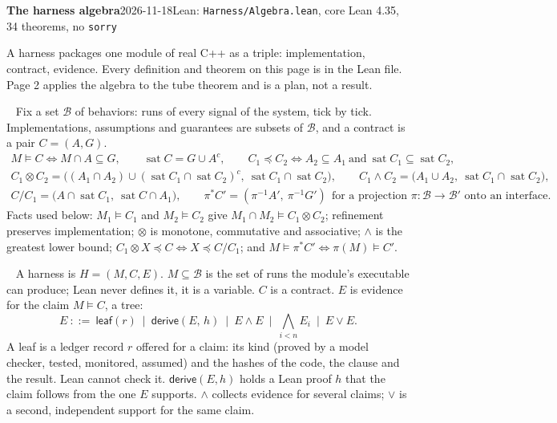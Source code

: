\documentclass[10pt]{article}
\newcommand{\head}[1]{\par\vspace{2pt}{\color{accent}\bfseries #1}\ }
\newcommand{\B}{\mathcal{B}}
\newcommand{\sat}{\operatorname{sat}}
\newcommand{\lean}[1]{\texttt{#1}}
\begin{document}
\fontsize{9.5pt}{11.4pt}\selectfont
\setlength{\abovedisplayskip}{3pt}\setlength{\belowdisplayskip}{3pt}\setlength{\abovedisplayshortskip}{2pt}\setlength{\belowdisplayshortskip}{2pt}

{\LARGE\bfseries The harness algebra}\hfill{\small 2026-11-18\quad Lean: \lean{Harness/Algebra.lean}, core Lean 4.35, 34 theorems, no \lean{sorry}}

\vspace{2pt}
A harness packages one module of real C++ as a triple: implementation, contract, evidence. Every definition and theorem on this page is in the Lean file. Page 2 applies the algebra to the tube theorem and is a plan, not a result.

\head{1. Contracts (recalled).} Fix a set $\B$ of behaviors: runs of every signal of the system, tick by tick. Implementations, assumptions and guarantees are subsets of $\B$, and a contract is a pair $C=(A,G)$.
\begin{gather*}
M\models C \iff M\cap A\subseteq G,\qquad \sat C = G\cup A^{c},\qquad C_1\preceq C_2 \iff A_2\subseteq A_1 \ \text{and}\ \sat C_1\subseteq \sat C_2,\\
C_1\otimes C_2=\bigl((A_1\cap A_2)\cup(\sat C_1\cap \sat C_2)^{c},\ \sat C_1\cap \sat C_2\bigr),\qquad
C_1\wedge C_2=\bigl(A_1\cup A_2,\ \sat C_1\cap \sat C_2\bigr),\\
C/C_1=\bigl(A\cap \sat C_1,\ \sat C\cap A_1\bigr),\qquad \pi^{*}C'=(\pi^{-1}A',\ \pi^{-1}G')\ \ \text{for a projection } \pi:\B\to\B' \text{ onto an interface.}
\end{gather*}
Facts used below: $M_1\models C_1$ and $M_2\models C_2$ give $M_1\cap M_2\models C_1\otimes C_2$; refinement preserves implementation; $\otimes$ is monotone, commutative and associative; $\wedge$ is the greatest lower bound; $C_1\otimes X\preceq C \iff X\preceq C/C_1$; and $M\models\pi^{*}C' \iff \pi(M)\models C'$.

\head{2. Harness.} A harness is $H=(M,C,E)$. $M\subseteq\B$ is the set of runs the module's executable can produce; Lean never defines it, it is a variable. $C$ is a contract. $E$ is evidence for the claim $M\models C$, a tree:
\[
E \ ::=\ \mathsf{leaf}(r)\ \mid\ \mathsf{derive}(E,\,h)\ \mid\ E\wedge E\ \mid\ \textstyle\bigwedge_{i<n}E_i\ \mid\ E\vee E .
\]
A leaf is a ledger record $r$ offered for a claim: its kind (proved by a model checker, tested, monitored, assumed) and the hashes of the code, the clause and the result. Lean cannot check it. $\mathsf{derive}(E,h)$ holds a Lean proof $h$ that the claim follows from the one $E$ supports. $\wedge$ collects evidence for several claims; $\vee$ is a second, independent support for the same claim.
\end{document}
